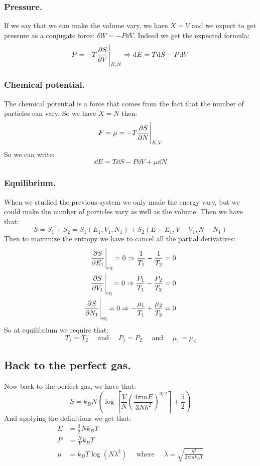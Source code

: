 \documentclass[10pt,a4paper]{book}
\begin{document}
\subsubsection{Pressure.}
If we say that we can make the volume vary, we have $X = V$ and we expect to get pressure as a conjugate force: $\delta W = - P \dd V$. Indeed we get the expected formula:
\[
P = -T \pdv{S}{V}\Bigg|_{E, N} \Rightarrow \dd E = T \dd S - P \dd V
\]
\subsubsection{Chemical potential.}
The chemical potential is a force that comes from the fact that the number of particles can vary. So we have $X = N$ then:
\[
F = \mu = -T \pdv{S}{N}\Bigg|_{E, V}
\]
So we can write:
\[
\dd E = T \dd S - P \dd V + \mu \dd N
\]
\subsubsection{Equilibrium.}
When we studied the previous system we only made the energy vary, but we could make the number of particles vary as well as the volume. Then we have that:
\[
S = S_1 + S_2 = S_1(E_1, V_1, N_1) + S_2(E - E_1, V - V_1, N- N_1)
\]
Then to maximize the entropy we have to cancel all the partial derivatives:
\begin{align*}
\pdv{S}{E_1}\Bigg|_{\text{eq}} = 0 \Rightarrow \frac{1}{T_1} - \frac{1}{T_2} = 0\\
\pdv{S}{V_1}\Bigg|_{\text{eq}} = 0 \Rightarrow \frac{P_1}{T_1} - \frac{P_2}{T_2} = 0\\
\pdv{S}{N_1}\Bigg|_\text{eq} = 0 \Rightarrow -\frac{\mu_1}{T_1} + \frac{\mu_2}{T_2} = 0
\end{align*}
So at equilibrium we require that:
\[
T_1 = T_2 \quad \text{ and } \quad P_1 = P_2 \quad \text{ and } \quad \mu_1 = \mu_2
\]

\subsection{Back to the perfect gas.}
Now back to the perfect gas, we have that:
\[
S = k_B N \left( \log \left[\frac{V}{N} \left(\frac{4\pi m E}{3 N h^2}\right)^{3/2} \right] + \frac{5}{2} \right)
\]
And applying the definitions we get that:
\begin{align*}
E &= \frac{3}{2} N k_B T\\
P &= \frac{N}{V} k_B T\\
\mu &= k_B T \log(N \lambda^3) \quad \text{ where } \quad  \lambda = \sqrt{\frac{h^2}{2\pi m k_B T}}
\end{align*}
\end{document}

